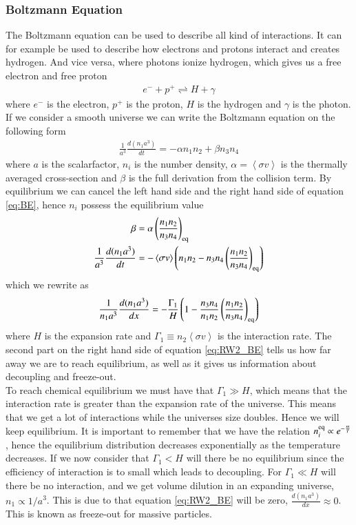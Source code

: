 \documentclass{aa}
\begin{document}
\subsubsection{Boltzmann Equation}
The Boltzmann equation can be used to describe all kind of interactions. It can for example be used to describe how electrons and protons interact and creates hydrogen. And vice versa, where photons ionize hydrogen, which gives us a free electron and free proton
\begin{align*}
    e^- + p^+ \rightleftharpoons H + \gamma
\end{align*}
where $e^-$ is the electron, $p^+$ is the proton, $H$ is the hydrogen and $\gamma$ is the photon.\\
If we consider a smooth universe we can write the Boltzmann equation on the following form
\begin{align}
    \frac{1}{a^3}\frac{d(n_1 a^3)}{dt} = -\alpha n_1n_2 + \beta n_3n_4 \label{eq:BE}
\end{align}
where $a$ is the scalarfactor, $n_i$ is the number density, $\alpha = \left<\sigma v\right>$ is the thermally averaged cross-section and $\beta$ is the full derivation from the collision term. By equilibrium we can cancel the left hand side and the right hand side of equation \eqref{eq:BE}, hence $n_i$ possess the equilibrium value
\begin{align}
    \beta &= \alpha \left(\frac{n_1n_2}{n_3n_4}\right)_{\rm eq} \notag\\
    \frac{1}{a^3}\frac{d(n_1 a^3)}{dt} &= -\left<\sigma v\right>  \left(n_1n_2 - n_3 n_4 \left(\frac{n_1n_2}{n_3n_4}\right)_{\rm eq}\right) \label{eq:H_pro}
\end{align}
which we rewrite as
\begin{align}
    \frac{1}{n_1a^3}\frac{d(n_1 a^3)}{d x} = - \frac{\Gamma_1}{H}\left(1 - \frac{n_3 n_4}{n_1n_2} \left(\frac{n_1n_2}{n_3n_4}\right)_{\rm eq}\right) \label{eq:RW2_BE}
\end{align}
where $H$ is the expansion rate and $\Gamma_1 \equiv n_2\left<\sigma v\right>$ is the interaction rate. The second part on the right hand side of equation \eqref{eq:RW2_BE} tells us how far away we are to reach equilibrium, as well as it gives us information about decoupling and freeze-out.\\
To reach chemical equilibrium we must have that $\Gamma_1 \gg H$, which means that the interaction rate is greater than the expansion rate of the universe. This means that we get a lot of interactions while the universes size doubles. Hence we will keep equilibrium. It is important to remember that we have the relation $n_i^{\rm eq} \propto e^{-\frac{m}{T}}$, hence the equilibrium distribution decreases exponentially as the temperature decreases. If we now consider that $\Gamma_1 < H$ will there be no equilibrium since the efficiency of interaction is to small which leads to decoupling. For $\Gamma_1 \ll H$ will there be no interaction, and we get volume dilution in an expanding universe, $n_1\propto 1/a^3$. This is due to that equation \eqref{eq:RW2_BE} will be zero, $\frac{d(n_1a^3)}{dx}\approx0$. This is known as freeze-out for massive particles.
\end{document}
